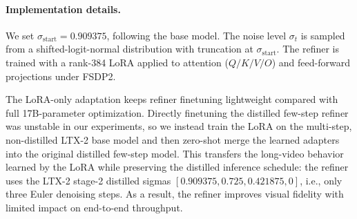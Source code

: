 \documentclass{llmxive}
\begin{document}
\paragraph{Implementation details.}
We set $\sigma_{\text{start}} = 0.909375$, following the base model. The
noise level $\sigma_t$ is sampled from a shifted-logit-normal distribution
with truncation at $\sigma_{\text{start}}$. The refiner is trained with a
rank-384 LoRA applied to attention ($Q/K/V/O$) and feed-forward projections
under FSDP2.

\noindent The LoRA-only adaptation keeps refiner finetuning lightweight compared with
full 17B-parameter optimization. Directly finetuning the distilled few-step
refiner was unstable in our experiments, so we instead train the LoRA on the
multi-step, non-distilled LTX-2 base model and then zero-shot merge the learned
adapters into the original distilled few-step model. This transfers the
long-video behavior learned by the LoRA while preserving the distilled
inference schedule: the refiner uses the LTX-2 stage-2 distilled
sigmas $[0.909375, 0.725, 0.421875, 0]$, i.e., only three Euler denoising
steps. As a result, the refiner improves visual fidelity with limited impact
on end-to-end throughput.
\end{document}

